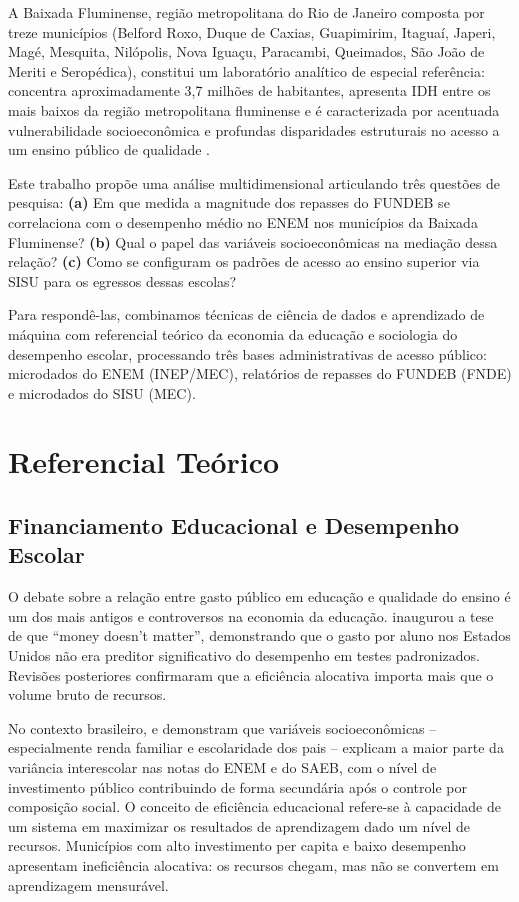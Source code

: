 \documentclass[12pt]{article}
\begin{document}
A Baixada Fluminense, região metropolitana do Rio de Janeiro composta por treze
municípios (Belford Roxo, Duque de Caxias, Guapimirim, Itaguaí, Japeri, Magé,
Mesquita, Nilópolis, Nova Iguaçu, Paracambi, Queimados, São João de Meriti e
Seropédica), constitui um laboratório analítico de especial referência: concentra
aproximadamente 3,7 milhões de habitantes, apresenta IDH entre os mais baixos da
região metropolitana fluminense e é caracterizada por acentuada vulnerabilidade
socioeconômica e profundas disparidades estruturais no acesso a um ensino público de
qualidade \cite{souza2022, oliveira2025, albuquerque2021}.

Este trabalho propõe uma análise multidimensional articulando três questões de pesquisa:
\textbf{(a)} Em que medida a magnitude dos repasses do FUNDEB se correlaciona com o
desempenho médio no ENEM nos municípios da Baixada Fluminense?
\textbf{(b)} Qual o papel das variáveis socioeconômicas na mediação dessa relação?
\textbf{(c)} Como se configuram os padrões de acesso ao ensino superior via SISU para
os egressos dessas escolas?

Para respondê-las, combinamos técnicas de ciência de dados e aprendizado de máquina com
referencial teórico da economia da educação e sociologia do desempenho escolar,
processando três bases administrativas de acesso público: microdados do ENEM (INEP/MEC),
relatórios de repasses do FUNDEB (FNDE) e microdados do SISU (MEC).

\section{Referencial Teórico}
\label{sec:referencial}

\subsection{Financiamento Educacional e Desempenho Escolar}

O debate sobre a relação entre gasto público em educação e qualidade do ensino é um
dos mais antigos e controversos na economia da educação. \cite{hanushek1986} inaugurou
a tese de que ``money doesn't matter'', demonstrando que o gasto por aluno nos Estados
Unidos não era preditor significativo do desempenho em testes padronizados. Revisões
posteriores \cite{hanushek2003} confirmaram que a eficiência alocativa importa mais
que o volume bruto de recursos.

No contexto brasileiro, \cite{soaresalves2013} e \cite{ferrao2022} demonstram que
variáveis socioeconômicas -- especialmente renda familiar e escolaridade dos pais --
explicam a maior parte da variância interescolar nas notas do ENEM e do SAEB, com o
nível de investimento público contribuindo de forma secundária após o controle por
composição social. O conceito de eficiência educacional refere-se à capacidade de um
sistema em maximizar os resultados de aprendizagem dado um nível de recursos.
Municípios com alto investimento per capita e baixo desempenho apresentam ineficiência
alocativa: os recursos chegam, mas não se convertem em aprendizagem mensurável.
\end{document}
